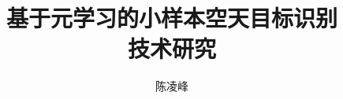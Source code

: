 \documentclass[doctor,twoside,ttf]{nudtpaper}
\title{基于元学习的小样本空天目标识别\\技术研究}
\author{陈凌峰}
\renewcommand{\maketitle}{} %
\begin{document}
	\graphicspath{{figures/}}

\clearpage

\makeatletter
\if@twoside
  \cleardoublepage
\else
  \clearpage
\fi
\makeatother

\renewcommand{\baselinestretch}{1.5} %
\normalsize %

\frontmatter
\tableofcontents
\listoftables
\listoffigures

\midmatter



\mainmatter
\renewcommand\UrlFont{\timesnr}
\makeatletter
{}
\def\cleardoublepage{%
	\clearpage
	\if@twoside
	\ifodd\c@page
	\else
	\hbox{}\newpage\stepcounter{blankpages}%
	\thispagestyle{empty}%
	\if@twocolumn\hbox{}\newpage\fi
	\fi
	\fi
}
\newcommand{\@romannoblank}[1]{%
	\@roman{\numexpr#1-\value{blankpages}\relax}%
}
\makeatother







\end{document}
